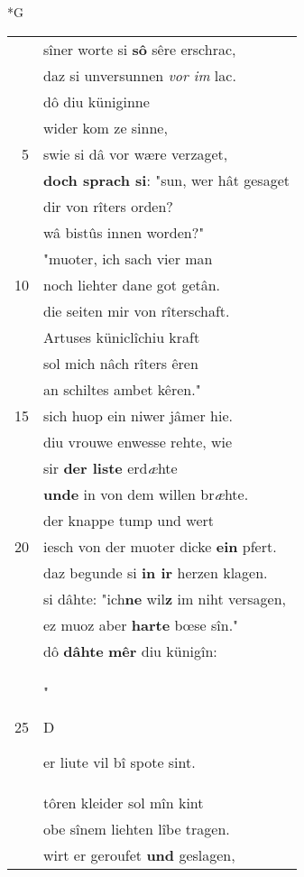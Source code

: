 \documentclass[8pt,a4paper,notitlepage]{article}
\begin{document}
\begin{table}[ht]
\begin{minipage}[t]{0.5\linewidth}
\small
\begin{center}*G
\end{center}
\begin{tabular}{rl}
 & sîner worte si \textbf{sô} sêre erschrac,\\ 
 & daz si unversunnen \textit{vor im} lac.\\ 
 & dô diu küniginne\\ 
 & wider kom ze sinne,\\ 
5 & swie si dâ vor wære verzaget,\\ 
 & \textbf{doch sprach si}: "sun, wer hât gesaget\\ 
 & dir von rîters orden?\\ 
 & wâ bistûs innen worden?"\\ 
 & "muoter, ich sach vier man\\ 
10 & noch liehter dane got getân.\\ 
 & die seiten mir von rîterschaft.\\ 
 & Artuses küniclîchiu kraft\\ 
 & sol mich nâch rîters êren\\ 
 & an schiltes ambet kêren."\\ 
15 & sich huop ein niwer jâmer hie.\\ 
 & diu vrouwe enwesse rehte, wie\\ 
 & sir \textbf{der liste} erd\textit{æ}hte\\ 
 & \textbf{unde} in von dem willen br\textit{æ}hte.\\ 
 & der knappe tump und wert\\ 
20 & iesch von der muoter dicke \textbf{ein} pfert.\\ 
 & daz begunde si \textbf{in ir} herzen klagen.\\ 
 & si dâhte: "ich\textbf{ne} wil\textbf{z} im niht versagen,\\ 
 & ez muoz aber \textbf{harte} bœse sîn."\\ 
 & dô \textbf{dâhte} \textbf{mêr} diu künigîn:\\ 
25 & "\begin{large}D\end{large}er liute vil bî spote sint.\\ 
 & tôren kleider sol mîn kint\\ 
 & obe sînem liehten lîbe tragen.\\ 
 & wirt er geroufet \textbf{und} geslagen,\\ 

\end{tabular}
\end{minipage}
\end{table}
\end{document}
